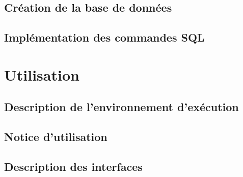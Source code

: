 \documentclass[a4paper, 12pt]{article}
\begin{document}
    \subsection{Création de la base de données}
    

    \subsection{Implémentation des commandes SQL}
   

\section{Utilisation}

    \subsection{Description de l’environnement d’exécution}
   

    \subsection{Notice d’utilisation}
   

    \subsection{Description des interfaces}
   
\end{document}
